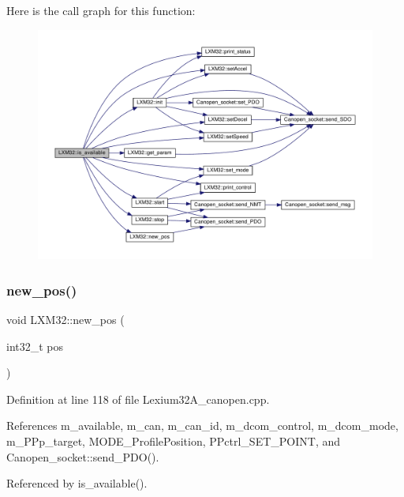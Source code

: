Here is the call graph for this function\+:\nopagebreak
\begin{figure}[H]
\begin{center}
\leavevmode
\includegraphics[width=350pt]{class_l_x_m32_a0a18e2b7e7d312156457c5a5b00def2e_cgraph}
\end{center}
\end{figure}
\mbox{\label{class_l_x_m32_a3b470e3d484fc0fb2a208df10a8e29e7}} 
\subsubsection{\texorpdfstring{new\+\_\+pos()}{new\_pos()}}
{\footnotesize\ttfamily void L\+X\+M32\+::new\+\_\+pos (\begin{DoxyParamCaption}\item[{int32\+\_\+t}]{pos }\end{DoxyParamCaption})}



Definition at line 118 of file Lexium32\+A\+\_\+canopen.\+cpp.



References m\+\_\+available, m\+\_\+can, m\+\_\+can\+\_\+id, m\+\_\+dcom\+\_\+control, m\+\_\+dcom\+\_\+mode, m\+\_\+\+P\+Pp\+\_\+target, M\+O\+D\+E\+\_\+\+Profile\+Position, P\+Pctrl\+\_\+\+S\+E\+T\+\_\+\+P\+O\+I\+NT, and Canopen\+\_\+socket\+::send\+\_\+\+P\+D\+O().



Referenced by is\+\_\+available().

